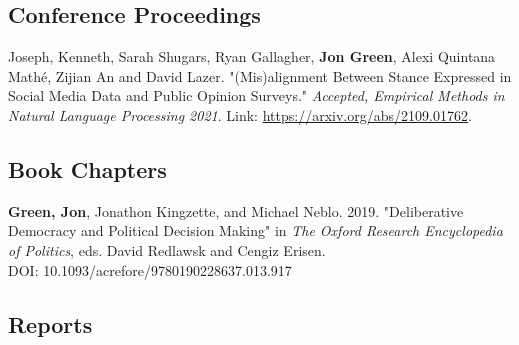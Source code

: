 \documentclass[letterpaper]{article}
\renewenvironment{itemize}{
  \begin{list}{}{
    \setlength{\leftmargin}{1.5em}
  }
}{
  \end{list}
}
\begin{document}
\subsection*{Conference Proceedings}

\begin{itemize}
\item Joseph, Kenneth, Sarah Shugars, Ryan Gallagher, \textbf{Jon Green}, Alexi Quintana Mathé, Zijian An and David Lazer. "(Mis)alignment Between Stance Expressed in Social Media Data and Public Opinion Surveys." \textit{Accepted, Empirical Methods in Natural Language Processing 2021}. Link: \url{https://arxiv.org/abs/2109.01762}.
\end{itemize}

\subsection*{Book Chapters}

\begin{itemize}
\item \textbf{Green, Jon}, Jonathon Kingzette, and Michael Neblo. 2019. "Deliberative Democracy and Political Decision Making" in \textit{The Oxford Research Encyclopedia of Politics}, eds. David Redlawsk and Cengiz Erisen.\\
DOI: 10.1093/acrefore/9780190228637.013.917
\end{itemize}

\subsection*{Reports}
\end{document}
